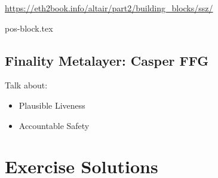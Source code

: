 \href{https://eth2book.info/altair/part2/building\_blocks/ssz/}{https://eth2book.info/altair/part2/building\_blocks/ssz/}

{pos-block.tex}
\subsection{Finality Metalayer: Casper FFG}
Talk about:
\begin{itemize}
    \item Plausible Liveness
    \item Accountable Safety
\end{itemize}

\section{Exercise Solutions}
\shipoutAnswer